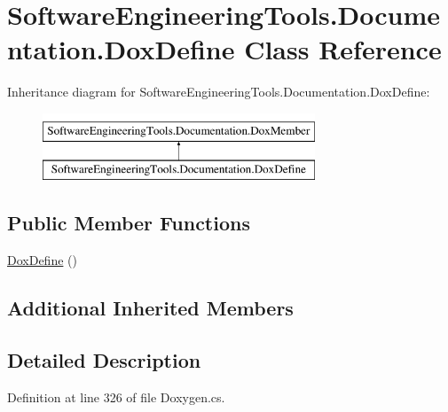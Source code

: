 \hypertarget{class_software_engineering_tools_1_1_documentation_1_1_dox_define}{\section{Software\+Engineering\+Tools.\+Documentation.\+Dox\+Define Class Reference}
\label{class_software_engineering_tools_1_1_documentation_1_1_dox_define}
}
Inheritance diagram for Software\+Engineering\+Tools.\+Documentation.\+Dox\+Define\+:\begin{figure}[H]
\begin{center}
\leavevmode
\includegraphics[height=2.000000cm]{class_software_engineering_tools_1_1_documentation_1_1_dox_define}
\end{center}
\end{figure}
\subsection*{Public Member Functions}
\begin{DoxyCompactItemize}
\item 
\hyperlink{class_software_engineering_tools_1_1_documentation_1_1_dox_define_a4ff243094d9576722ad05b1a9d10c5dc}{Dox\+Define} ()
\end{DoxyCompactItemize}
\subsection*{Additional Inherited Members}


\subsection{Detailed Description}


Definition at line 326 of file Doxygen.\+cs.



